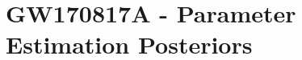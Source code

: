 \documentclass[twocolumn]{aastex62}
\newcommand{\epse}{\ensuremath{\varepsilon_{\mathrm{e}}}}
\newcommand{\epsB}{\ensuremath{\varepsilon_{\mathrm{B}}}}
\newcommand{\som}{\ensuremath{s_{\Omega}}}
\begin{document}
%

\section{GW170817A - Parameter Estimation Posteriors}\label{sec:corners}
\end{document}
